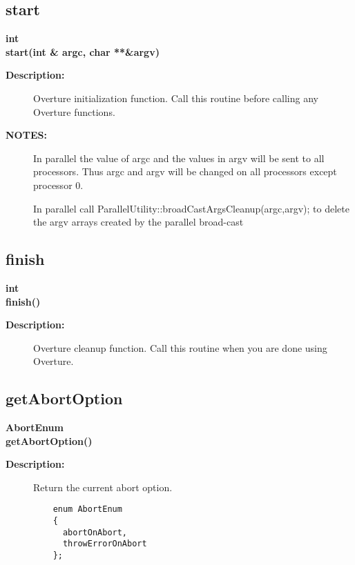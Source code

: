 \subsection{start}
 
\begin{flushleft} \textbf{%
int  \\ 
\settowidth{\OvertureIncludeArgIndent}{start(}%
start(int \& argc, char **\&argv)
}\end{flushleft}
\begin{description}
\item[{\bf Description:}] 
    Overture initialization function. Call this routine before calling any Overture functions.

\item[{\bf NOTES:}] 
    In parallel the value of argc and the values in argv will be sent to all processors.
   Thus argc and argv will be changed on all processors except processor 0. 
 
 In parallel call 
     ParallelUtility::broadCastArgsCleanup(argc,argv);
 to delete the argv arrays created by the parallel broad-cast

\end{description}
\subsection{finish}
 
\begin{flushleft} \textbf{%
int  \\ 
\settowidth{\OvertureIncludeArgIndent}{finish(}%
finish()
}\end{flushleft}
\begin{description}
\item[{\bf Description:}] 
    Overture cleanup function. Call this routine when you are done using Overture.
\end{description}
\subsection{getAbortOption}
 
\begin{flushleft} \textbf{%
AbortEnum  \\ 
\settowidth{\OvertureIncludeArgIndent}{getAbortOption(}%
getAbortOption()
}\end{flushleft}
\begin{description}
\item[{\bf Description:}] 
   Return the current abort option.
 \begin{verbatim}
    enum AbortEnum
    {
      abortOnAbort,
      throwErrorOnAbort
    };
 \end{verbatim}
\end{description}
